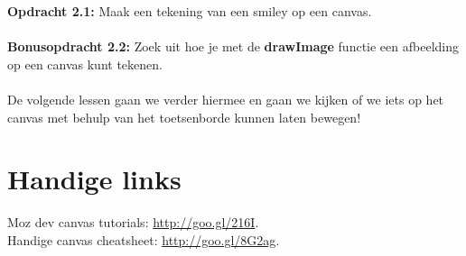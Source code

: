 \documentclass[a4paper]{report}
\begin{document}
\begin{center}
\end{center}

\clearpage







\noindent \textbf{Opdracht 2.1:} Maak een tekening van een smiley op een canvas.
\\
\\
\noindent \textbf{Bonusopdracht 2.2:} Zoek uit hoe je met de \textbf{drawImage} functie een afbeelding op een canvas kunt tekenen.
\\
\\
\noindent De volgende lessen gaan we verder hiermee en gaan we kijken of we iets op het canvas met behulp van het toetsenborde kunnen laten bewegen!

\section*{Handige links}
Moz dev canvas tutorials: \url{http://goo.gl/216I}. 
\\
\noindent Handige canvas cheatsheet: \url{http://goo.gl/8G2ag}.
\end{document}

